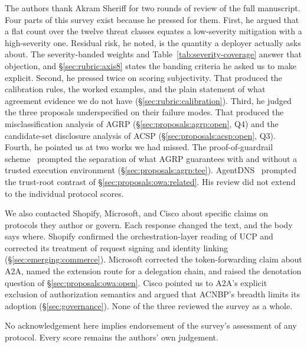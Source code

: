 \begin{acks}
The authors thank Akram Sheriff for two rounds of review of
the full manuscript. Four parts of this survey exist because
he pressed for them. First, he argued that a flat count over
the twelve threat classes equates a low-severity mitigation
with a high-severity one. Residual risk, he noted, is the
quantity a deployer actually asks about. The severity-banded
weights and Table~\ref{tab:severity-coverage} answer that
objection, and \S\ref{sec:rubric:axis8} states the banding
criteria he asked us to make explicit. Second, he pressed
twice on scoring subjectivity. That produced the calibration
rules, the worked examples, and the plain statement of what
agreement evidence we do not have
(\S\ref{sec:rubric:calibration}). Third, he judged the three
proposals underspecified on their failure modes. That
produced the misclassification analysis of AGRP
(\S\ref{sec:proposals:agrp:open}, Q4) and the candidate-set
disclosure analysis of ACSP
(\S\ref{sec:proposals:acsp:open}, Q3). Fourth, he pointed us
at two works we had missed. The proof-of-guardrail
scheme~\cite{proof_of_guardrail} prompted the separation of
what AGRP guarantees with and without a trusted execution
environment (\S\ref{sec:proposals:agrp:tee}).
AgentDNS~\cite{agentdns} prompted the trust-root contrast of
\S\ref{sec:proposals:owa:related}. His review did
not extend to the individual protocol scores.

We also contacted Shopify, Microsoft, and Cisco about
specific claims on protocols they author or govern. Each
response changed the text, and the body says where. Shopify
confirmed the orchestration-layer reading of UCP and
corrected its treatment of request signing and identity
linking (\S\ref{sec:emerging:commerce}). Microsoft corrected the
token-forwarding claim about A2A, named the extension route
for a delegation chain, and raised the denotation question of
\S\ref{sec:proposals:owa:open}. Cisco pointed us to A2A's
explicit exclusion of authorization semantics and argued that
ACNBP's breadth limits its adoption
(\S\ref{sec:governance}). None of the three reviewed the
survey as a whole.

No acknowledgement here implies
endorsement of the survey's assessment of any protocol.
Every score remains the authors' own judgement.
\end{acks}
